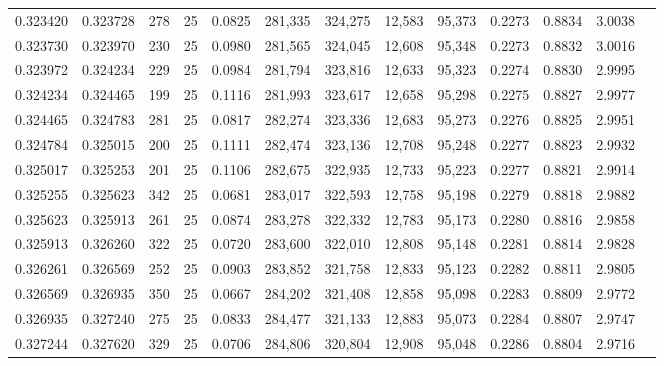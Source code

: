 \begin{tabular}{rrrrrrrrrrrrr}
0.323420 & 0.323728 &   278 &  25 &                                     0.0825 & 281,335 & 324,275 &  12,583 &  95,373 & 0.2273 & 0.8834 & 3.0038 \\
0.323730 & 0.323970 &   230 &  25 &                                     0.0980 & 281,565 & 324,045 &  12,608 &  95,348 & 0.2273 & 0.8832 & 3.0016 \\
0.323972 & 0.324234 &   229 &  25 &                                     0.0984 & 281,794 & 323,816 &  12,633 &  95,323 & 0.2274 & 0.8830 & 2.9995 \\
0.324234 & 0.324465 &   199 &  25 &                                     0.1116 & 281,993 & 323,617 &  12,658 &  95,298 & 0.2275 & 0.8827 & 2.9977 \\
0.324465 & 0.324783 &   281 &  25 &                                     0.0817 & 282,274 & 323,336 &  12,683 &  95,273 & 0.2276 & 0.8825 & 2.9951 \\
0.324784 & 0.325015 &   200 &  25 &                                     0.1111 & 282,474 & 323,136 &  12,708 &  95,248 & 0.2277 & 0.8823 & 2.9932 \\
0.325017 & 0.325253 &   201 &  25 &                                     0.1106 & 282,675 & 322,935 &  12,733 &  95,223 & 0.2277 & 0.8821 & 2.9914 \\
0.325255 & 0.325623 &   342 &  25 &                                     0.0681 & 283,017 & 322,593 &  12,758 &  95,198 & 0.2279 & 0.8818 & 2.9882 \\
0.325623 & 0.325913 &   261 &  25 &                                     0.0874 & 283,278 & 322,332 &  12,783 &  95,173 & 0.2280 & 0.8816 & 2.9858 \\
0.325913 & 0.326260 &   322 &  25 &                                     0.0720 & 283,600 & 322,010 &  12,808 &  95,148 & 0.2281 & 0.8814 & 2.9828 \\
0.326261 & 0.326569 &   252 &  25 &                                     0.0903 & 283,852 & 321,758 &  12,833 &  95,123 & 0.2282 & 0.8811 & 2.9805 \\
0.326569 & 0.326935 &   350 &  25 &                                     0.0667 & 284,202 & 321,408 &  12,858 &  95,098 & 0.2283 & 0.8809 & 2.9772 \\
0.326935 & 0.327240 &   275 &  25 &                                     0.0833 & 284,477 & 321,133 &  12,883 &  95,073 & 0.2284 & 0.8807 & 2.9747 \\
0.327244 & 0.327620 &   329 &  25 &                                     0.0706 & 284,806 & 320,804 &  12,908 &  95,048 & 0.2286 & 0.8804 & 2.9716 \\

\end{tabular}
